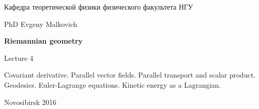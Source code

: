 \documentclass[12pt,pagesize,paper=landscape,paper=192mm:108mm]{scrbook}
\begin{document}
\begin{titlepage}
\begin{center}
    Кафедра теоретической физики физического факультета НГУ
    \medskip

    \Large
    PhD Evgeny Malkovich

    \huge
    \textbf{Riemannian geometry}
    \smallskip

    \Large
    Lecture 4
    \vfill

    \normalsize
    \begin{minipage}{0.6\linewidth}
      Covariant derivative. Parallel vector fields. Parallel transport
      and scalar product. Geodesics. Euler-Lagrange equations. Kinetic
      energy as a Lagrangian.
    \end{minipage}
    \vfill

    \normalsize \ccbysa\hspace{0.5em}  Novosibirsk 2016
  \end{center}
\end{titlepage}
\end{document}
